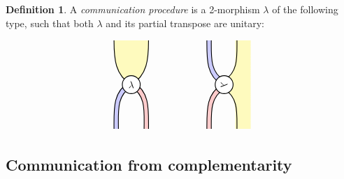 \documentclass[a4paper,12pt]{article}
\theoremstyle{definition}
\newtheorem{defn}[theorem]{Definition}
\renewcommand{\-}[0]{\nobreakdash-\hspace{0pt}}
\def\fillA{blue!40}
\def\fillB{red!40}
\def\fillD{yellow!50}
\def\sideangle{30}
\def\nwangle{180-\sideangle}
\def\neangle{\sideangle}
\def\swangle{180+\sideangle}
\def\seangle{-\sideangle}
\begin{document}
\begin{defn}
A \textit{communication procedure} is a 2\-morphism $\lambda$ of the following type, such that both $\lambda$ and its partial transpose are unitary:

\begin{equation*}
\begin{aligned}
\begin{tikzpicture} [thick, scale=0.8, fill opacity=0.5]
\draw [fill=\fillD, draw=none, fill opacity=0.5](0.78,2)
to [out=down, in=\neangle](0,0)
to [out=\nwangle, in=down](-0.78, 2);
\draw (0.78,2)
to [out=down, in=\neangle](0,0)
to [out=\nwangle, in=down](-0.78, 2);
\draw [fill=\fillB, draw=none] (0.78,-2)
to [out=up, in=\seangle](0.1,0.1)
to (0, -0.1)
to [out=\seangle, in=up](0.58, -2);
\draw (0.78,-2)
to [out=up, in=\seangle](0.1,0.1)
to (0, -0.1)
to [out=\seangle, in=up](0.58, -2);
\draw [fill=\fillA, draw=none] (-0.78,-2)
to [out=up, in=\swangle](-0.1,0.1)
to (0, -0.1)
to [out=\swangle, in=up](-0.58, -2);
\draw (-0.78,-2)
to [out=up, in=\swangle](-0.1,0.1)
to (0, -0.1)
to [out=\swangle, in=up](-0.58, -2);
\node [draw, fill=white, shape=circle, fill opacity=1]
 at (0, 0) {$\lambda$};
\end{tikzpicture}
\end{aligned}
\hspace{2cm}
\begin{aligned}
\begin{tikzpicture} [thick, scale=0.8, fill opacity=0.5]
\draw [fill=\fillD, draw=none, fill opacity=0.5]
(1.2,-2)to(0.5,-2)
to [out=up, in=\seangle](0,-0.2)
to (0, 0.2)
to [out=\neangle, in=down](0.5,2)
to (1.2,2);
\draw (0.58,-2)
to [out=up, in=\seangle](0,-0.2)
to (0, 0.2)
to [out=\neangle, in=down](0.58,2);
\draw [fill=\fillB, draw=none] (-0.78,-2)
to [out=up, in=\swangle](-0.1,-0)
to (0, -0.2)
to [out=\swangle, in=up](-0.58, -2);
\draw (-0.78,-2)
to [out=up, in=\swangle](-0.1,0)
to (0, -0.2)
to [out=\swangle, in=up](-0.58, -2);
\draw [fill=\fillA, draw=none] (-0.78,2)
to [out=down, in=\nwangle](-0.1,0)
to (0, 0.2)
to [out=\nwangle, in=down](-0.58, 2);
\draw (-0.78,2)
to [out=down, in=\nwangle](-0.1,0)
to (0, 0.2)
to [out=\nwangle, in=down](-0.58, 2);
\node [draw, fill=white, fill opacity=1,shape=circle, rotate=-90]
 at (0, 0) {$\lambda$};
\end{tikzpicture}
\end{aligned}
\end{equation*}
\end{defn}

\subsection{Communication from complementarity}
\label{sec:bigproof}
\end{document}
